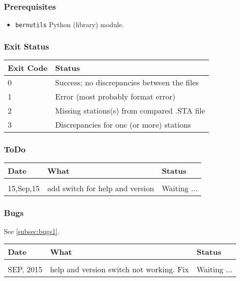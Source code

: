 \subsubsection{Prerequisites}
\begin{itemize}
\item \texttt{bernutils} Python (library) module.
\end{itemize}

\subsubsection{Exit Status}
\begin{tabular}{l l}
\label{tab:cs_exit_status}
Exit Code & Status\\
\hline
0 & Success; no discrepancies between the files \\
1 & Error (most probably format error) \\
2 & Missing stations(s) from compared .STA file\footnotemark[2]\\
3 & Discrepancies for one (or more) stations\\
\hline
\end{tabular}

\subsubsection{ToDo}
\begin{tabular}{l l l}
Date & What & Status\\
\hline \\
15,Sep,15  & add switch for help and version & Waiting ...\\
\end{tabular}

\subsubsection{Bugs}
See \autoref{subsec:bugs1}.
\bigskip

\begin{tabular}{l l l}
Date & What & Status\\
\hline \\
SEP, 2015 & help and version switch not working. Fix & Waiting ...\\
\end{tabular}

